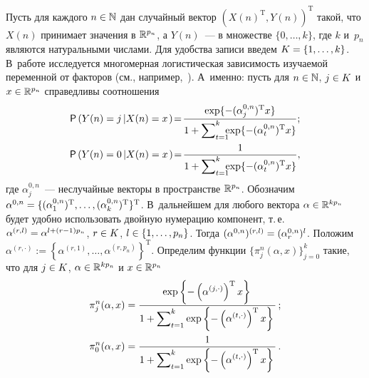 \begin{multicols}{2}
Пусть для каждого $n\hm\in\mathbb{N}$ дан случайный вектор $(X(n)^{\mathrm{T}},Y(n))^{\mathrm{T}}$ такой, что 
$X(n)$ принимает значения в $\mathbb R^{p_n}$, а $Y(n)$~--- в множестве $\{0,\ldots,k\}$, где $k$ 
и~$p_n$ являются натуральными числами. Для удобства записи введем $K\hm=\{1,\ldots,k\}$. 
В~работе исследуется многомерная логистическая зависимость изучаемой переменной от факторов 
(см., например,~\cite{Anderson}). А~именно: пусть для $n\hm\in\N$, $j\hm\in K$ и $x\hm\in\R^{p_n}$ 
справедливы соотношения
\begin{gather*}
\p\left(Y(n)=j\left|X(n)=x\right.\right)\!=\!\fr{\exp\{-(\alpha^{0,n}_j)^{\mathrm{T}}x\}}
{1+\sum\nolimits_{t=1}^k\!\!\!\hspace*{-0.5pt}\exp\{-(\alpha^{0,n}_t)^{\mathrm{T}}x\}};\\
\p\left(Y(n)=0\left|X(n)=x\right.\right)\!=\!\fr{1}{1+\sum\nolimits_{t=1}^k
\hspace*{-0.5pt}\!\!\!\exp\{-(\alpha^{0,n}_t)^{\mathrm{T}}x\}},
\end{gather*}
где $\alpha^{0,n}_j$~--- неслучайные векторы в пространстве $\mathbb R^{p_n}$. 
Обозначим $\alpha^{0,n}\hm=\{(\alpha^{0,n}_1)^{\mathrm{T}},\ldots,(\alpha^{0,n}_k)^{\mathrm{T}}\}^{\mathrm{T}}$. 
В~дальнейшем для любого вектора $\alpha\hm\in\R^{kp_n}$ будет удобно использовать 
двойную нумерацию компонент, т.\,е.\ $\alpha^{(r,l)}\hm=\alpha^{l+(r-1)p_n}$, 
$r\hm\in K$, $l\hm\in\{1,\ldots,p_n\}$. Тогда $(\alpha^{0,n})^{(r,l)}\hm=(\alpha^{0,n}_r)^l$. 
Положим $\alpha^{(r,\cdot)}:=\left\{\alpha^{(r,1)},\ldots,\alpha^{(r,p_n)}\right\}^{\mathrm{T}}$. 
Определим функции $\{\pi^n_j(\alpha,x)\}_{j=0}^k$ такие, что для 
$j\hm\in K$, $\alpha\hm\in\R^{kp_n}$ и $x\hm\in\R^{p_n}$
\begin{gather*}
\pi^n_j(\alpha,x)=\displaystyle\frac{\displaystyle \exp\left\{-\left(\alpha^{(j,\cdot)}\right)^{\mathrm{T}}x\right\}\mathstrut}{\displaystyle 1+\sum\nolimits_{t=1}^k\exp\left\{-\left(\alpha^{(t,\cdot)}\right)^{\mathrm{T}}x\right\}\mathstrut}\,;\\
\pi^n_0(\alpha,x)=\displaystyle\frac{\displaystyle 1\mathstrut}{\displaystyle 1+\sum\nolimits_{t=1}^k\exp\left\{-\left(\alpha^{(t,\cdot)}\right)^{\mathrm{T}}x\right\}\mathstrut}\,.
\end{gather*}


\end{multicols}
